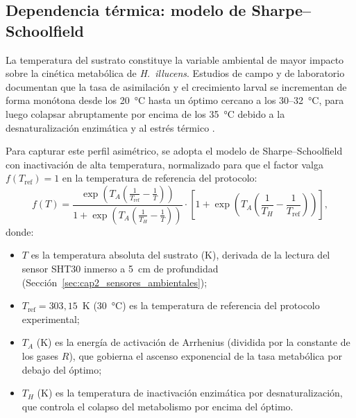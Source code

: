 \subsection{Dependencia térmica: modelo de Sharpe--Schoolfield}
\label{subsec:cap3_sharpe_schoolfield}

La temperatura del sustrato constituye la variable ambiental de mayor impacto sobre la cinética metabólica de \emph{H.~illucens}. Estudios de campo y de laboratorio documentan que la tasa de asimilación y el crecimiento larval se incrementan de forma monótona desde los \SI{20}{\celsius} hasta un óptimo cercano a los \SI{30}{}--\SI{32}{\celsius}, para luego colapsar abruptamente por encima de los \SI{35}{\celsius} debido a la desnaturalización enzimática y al estrés térmico \parencite{nayakHermetiaIllucensDiptera2023,salamEffectDifferentEnvironmental2022}.

Para capturar este perfil asimétrico, se adopta el modelo de Sharpe--Schoolfield con inactivación de alta temperatura, normalizado para que el factor valga $f(T_{\mathrm{ref}})=1$ en la temperatura de referencia del protocolo:
\begin{equation}
    f(T) = \frac{\exp\!\left(T_A\left(\frac{1}{T_{\mathrm{ref}}} - \frac{1}{T}\right)\right)}{1 + \exp\!\left(T_A\left(\frac{1}{T_H} - \frac{1}{T}\right)\right)} \cdot \left[1 + \exp\!\left(T_A\left(\frac{1}{T_H} - \frac{1}{T_{\mathrm{ref}}}\right)\right)\right],
\end{equation}
donde:
\begin{itemize}
    \item $T$ es la temperatura absoluta del sustrato (\si{\kelvin}), derivada de la lectura del sensor SHT30 inmerso a \SI{5}{\centi\metre} de profundidad (Sección~\ref{sec:cap2_sensores_ambientales});
    \item $T_{\mathrm{ref}} = 303{,}15$~\si{\kelvin} (\SI{30}{\celsius}) es la temperatura de referencia del protocolo experimental;
    \item $T_A$ (\si{\kelvin}) es la energía de activación de Arrhenius (dividida por la constante de los gases $R$), que gobierna el ascenso exponencial de la tasa metabólica por debajo del óptimo;
    \item $T_H$ (\si{\kelvin}) es la temperatura de inactivación enzimática por desnaturalización, que controla el colapso del metabolismo por encima del óptimo.
\end{itemize}

